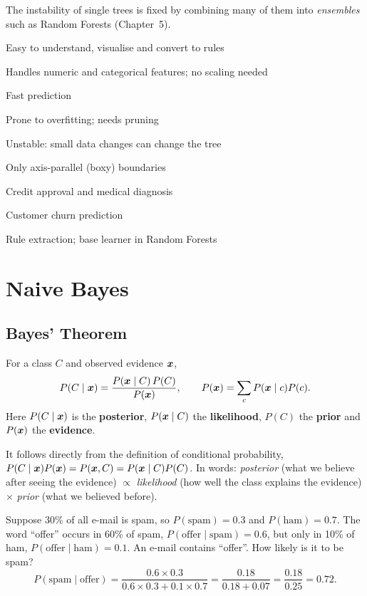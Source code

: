 The instability of single trees is fixed by combining many of them into \emph{ensembles} such as Random Forests (Chapter~5).

{\item Easy to understand, visualise and convert to rules
 \item Handles numeric and categorical features; no scaling needed
 \item Fast prediction}
{\item Prone to overfitting; needs pruning
 \item Unstable: small data changes can change the tree
 \item Only axis-parallel (boxy) boundaries}
{\item Credit approval and medical diagnosis
 \item Customer churn prediction
 \item Rule extraction; base learner in Random Forests}

\section{Naive Bayes}

\subsection{Bayes' Theorem}

\begin{definition}
For a class $C$ and observed evidence $\boldsymbol{x}$,
\[
  P(C\mid\boldsymbol{x})=\frac{P(\boldsymbol{x}\mid C)\,P(C)}{P(\boldsymbol{x})},\qquad
  P(\boldsymbol{x})=\sum_{c}P(\boldsymbol{x}\mid c)P(c).
\]
Here $P(C\mid\boldsymbol{x})$ is the \textbf{posterior}, $P(\boldsymbol{x}\mid C)$ the \textbf{likelihood}, $P(C)$ the \textbf{prior} and $P(\boldsymbol{x})$ the \textbf{evidence}.
\end{definition}

It follows directly from the definition of conditional probability, $P(C\mid\boldsymbol{x})P(\boldsymbol{x})=P(\boldsymbol{x},C)=P(\boldsymbol{x}\mid C)P(C)$. In words: \emph{posterior} (what we believe after seeing the evidence) $\propto$ \emph{likelihood} (how well the class explains the evidence) $\times$ \emph{prior} (what we believed before).

\begin{example}
Suppose 30\% of all e-mail is spam, so $P(\text{spam})=0.3$ and $P(\text{ham})=0.7$. The word ``offer'' occurs in 60\% of spam, $P(\text{offer}\mid\text{spam})=0.6$, but only in 10\% of ham, $P(\text{offer}\mid\text{ham})=0.1$. An e-mail contains ``offer''. How likely is it to be spam?
\[
P(\text{spam}\mid\text{offer})=\frac{0.6\times0.3}{0.6\times0.3+0.1\times0.7}=\frac{0.18}{0.18+0.07}=\frac{0.18}{0.25}=\mathbf{0.72}.
\]
\end{example}

